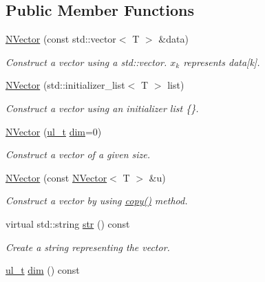 \subsection*{Public Member Functions}
\begin{DoxyCompactItemize}
\item 
\mbox{\hyperlink{class_n_vector_a786957fb5d1d9bdec7e6ced65bce03c0}{N\+Vector}} (const std\+::vector$<$ T $>$ \&data)
\begin{DoxyCompactList}\small\item\em Construct a vector using a {\ttfamily std\+::vector}. $ x_k $ represents {\ttfamily data\mbox{[}k\mbox{]}}. \end{DoxyCompactList}\item 
\mbox{\hyperlink{class_n_vector_a44c7b132c668c2aac890b66fe7ab0262}{N\+Vector}} (std\+::initializer\+\_\+list$<$ T $>$ list)
\begin{DoxyCompactList}\small\item\em Construct a vector using an initializer list {\ttfamily \{\}}. \end{DoxyCompactList}\item 
\mbox{\hyperlink{class_n_vector_a58eee5f012e4e563d477788051fc7f1d}{N\+Vector}} (\mbox{\hyperlink{group___n_algebra_ga1b140a2034db3f5dfe18a987745df43a}{ul\+\_\+t}} \mbox{\hyperlink{class_n_vector_a7589027db20509ac4d93490bb9a1979a}{dim}}=0)
\begin{DoxyCompactList}\small\item\em Construct a vector of a given size. \end{DoxyCompactList}\item 
\mbox{\hyperlink{class_n_vector_a7f648402b0fc9006ce9ced7ca647e600}{N\+Vector}} (const \mbox{\hyperlink{class_n_vector}{N\+Vector}}$<$ T $>$ \&u)
\begin{DoxyCompactList}\small\item\em Construct a vector by using {\ttfamily \mbox{\hyperlink{class_n_vector_a67128d2ff536b8ccd7a95cb680bd0431}{copy()}}} method. \end{DoxyCompactList}\item 
virtual std\+::string \mbox{\hyperlink{class_n_vector_a6d66b06b953197c1b3965ed69f9fd17e}{str}} () const
\begin{DoxyCompactList}\small\item\em Create a string representing the vector. \end{DoxyCompactList}\item 
\mbox{\hyperlink{group___n_algebra_ga1b140a2034db3f5dfe18a987745df43a}{ul\+\_\+t}} \mbox{\hyperlink{class_n_vector_a7589027db20509ac4d93490bb9a1979a}{dim}} () const

\end{DoxyCompactItemize}
